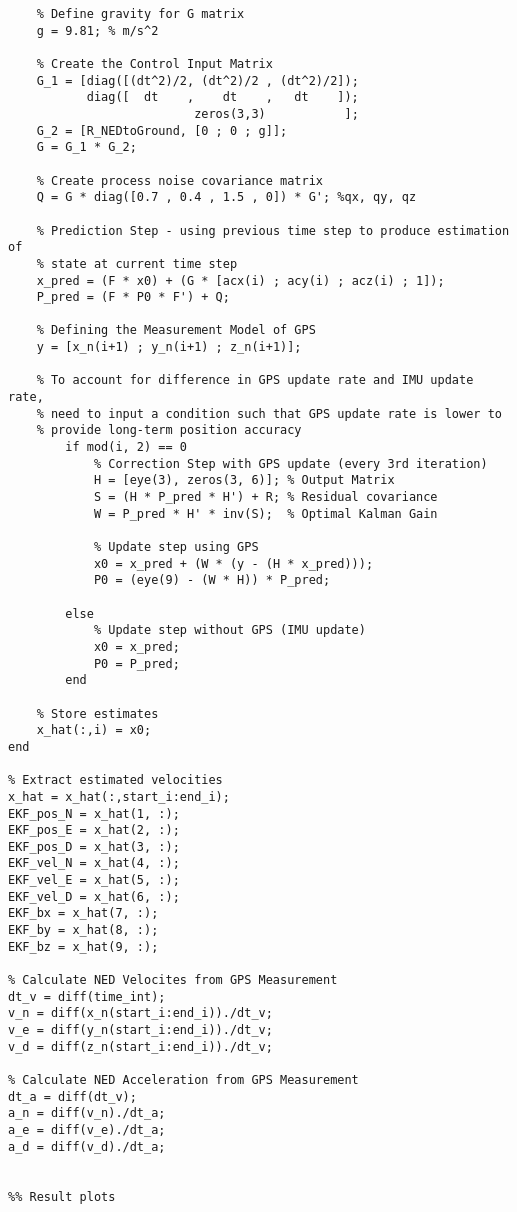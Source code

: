 \begin{lstlisting}
    % Define gravity for G matrix
    g = 9.81; % m/s^2

    % Create the Control Input Matrix
    G_1 = [diag([(dt^2)/2, (dt^2)/2 , (dt^2)/2]);
           diag([  dt    ,    dt    ,   dt    ]);
                          zeros(3,3)           ];
    G_2 = [R_NEDtoGround, [0 ; 0 ; g]];
    G = G_1 * G_2;

    % Create process noise covariance matrix
    Q = G * diag([0.7 , 0.4 , 1.5 , 0]) * G'; %qx, qy, qz

    % Prediction Step - using previous time step to produce estimation of
    % state at current time step
    x_pred = (F * x0) + (G * [acx(i) ; acy(i) ; acz(i) ; 1]);
    P_pred = (F * P0 * F') + Q;

    % Defining the Measurement Model of GPS
    y = [x_n(i+1) ; y_n(i+1) ; z_n(i+1)];

    % To account for difference in GPS update rate and IMU update rate,
    % need to input a condition such that GPS update rate is lower to
    % provide long-term position accuracy
        if mod(i, 2) == 0
            % Correction Step with GPS update (every 3rd iteration)
            H = [eye(3), zeros(3, 6)]; % Output Matrix
            S = (H * P_pred * H') + R; % Residual covariance
            W = P_pred * H' * inv(S);  % Optimal Kalman Gain

            % Update step using GPS
            x0 = x_pred + (W * (y - (H * x_pred)));
            P0 = (eye(9) - (W * H)) * P_pred;
        
        else
            % Update step without GPS (IMU update)
            x0 = x_pred;
            P0 = P_pred;
        end

    % Store estimates
    x_hat(:,i) = x0;
end   

% Extract estimated velocities
x_hat = x_hat(:,start_i:end_i);
EKF_pos_N = x_hat(1, :);
EKF_pos_E = x_hat(2, :);
EKF_pos_D = x_hat(3, :);
EKF_vel_N = x_hat(4, :);
EKF_vel_E = x_hat(5, :);
EKF_vel_D = x_hat(6, :);
EKF_bx = x_hat(7, :);
EKF_by = x_hat(8, :);
EKF_bz = x_hat(9, :);

% Calculate NED Velocites from GPS Measurement
dt_v = diff(time_int);
v_n = diff(x_n(start_i:end_i))./dt_v;
v_e = diff(y_n(start_i:end_i))./dt_v;
v_d = diff(z_n(start_i:end_i))./dt_v;

% Calculate NED Acceleration from GPS Measurement
dt_a = diff(dt_v);
a_n = diff(v_n)./dt_a;
a_e = diff(v_e)./dt_a;
a_d = diff(v_d)./dt_a;


%% Result plots


\end{lstlisting}
